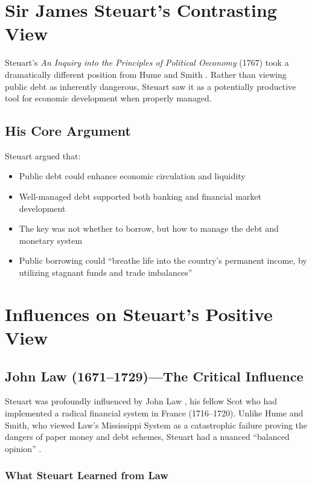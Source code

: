 \documentclass[12pt]{article}
\begin{document}
\section{Sir James Steuart's Contrasting View}

Steuart's \textit{An Inquiry into the Principles of Political Oeconomy} (1767) took a dramatically different position from Hume and Smith \citep{steuart1767}. Rather than viewing public debt as inherently dangerous, Steuart saw it as a potentially productive tool for economic development when properly managed.

\subsection{His Core Argument}

Steuart argued that:

\begin{itemize}
\item Public debt could enhance economic circulation and liquidity
\item Well-managed debt supported both banking and financial market development
\item The key was not whether to borrow, but how to manage the debt and monetary system
\item Public borrowing could ``breathe life into the country's permanent income, by utilizing stagnant funds and trade imbalances'' \citep{stettner1945}
\end{itemize}

\section{Influences on Steuart's Positive View}

\subsection{John Law (1671--1729)—The Critical Influence}

Steuart was profoundly influenced by John Law \citep{law1705}, his fellow Scot who had implemented a radical financial system in France (1716--1720). Unlike Hume and Smith, who viewed Law's Mississippi System as a catastrophic failure proving the dangers of paper money and debt schemes, Steuart had a nuanced ``balanced opinion'' \citep{bentemessek_betancourt2012}.

\subsubsection{What Steuart Learned from Law}
\end{document}
